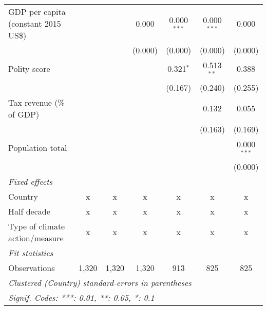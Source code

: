 \begin{tabular}{lcccccc}
   GDP per capita (constant 2015 US\$)                                                           &                &                & 0.000          & 0.000$^{***}$  & 0.000$^{***}$  & 0.000\\   
                                                                                                 &                &                & (0.000)        & (0.000)        & (0.000)        & (0.000)\\   
   Polity score                                                                                  &                &                &                & 0.321$^{*}$    & 0.513$^{**}$   & 0.388\\   
                                                                                                 &                &                &                & (0.167)        & (0.240)        & (0.255)\\   
   Tax revenue (\% of GDP)                                                                       &                &                &                &                & 0.132          & 0.055\\   
                                                                                                 &                &                &                &                & (0.163)        & (0.169)\\   
   Population total                                                                              &                &                &                &                &                & 0.000$^{***}$\\   
                                                                                                 &                &                &                &                &                & (0.000)\\   
   \emph{Fixed effects}\\
   Country                                                                                       & x              & x              & x              & x              & x              & x\\  
   Half decade                                                                                   & x              & x              & x              & x              & x              & x\\  
   Type of climate action/measure                                                                & x              & x              & x              & x              & x              & x\\  
   \midrule \emph{Fit statistics}\\
   Observations                                                                                  & 1,320          & 1,320          & 1,320          & 913            & 825            & 825\\  
   \midrule
   \multicolumn{7}{l}{\emph{Clustered (Country) standard-errors in parentheses}}\\
   \multicolumn{7}{l}{\emph{Signif. Codes: ***: 0.01, **: 0.05, *: 0.1}}\\
\end{tabular}
\par\endgroup


